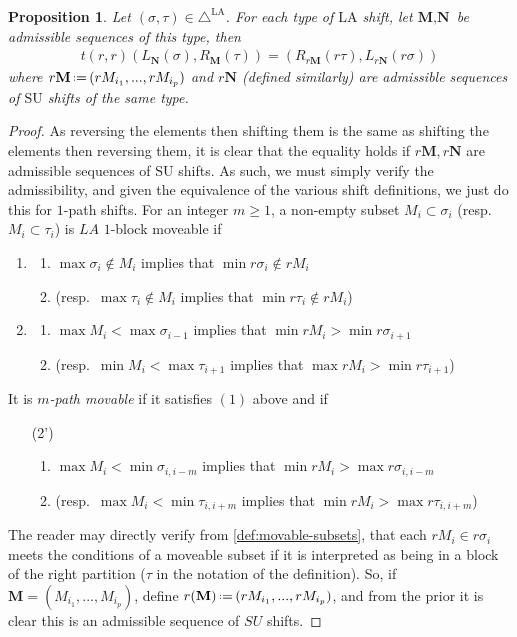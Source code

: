 \documentclass{amsart}
\newtheorem{proposition}[theorem]{Proposition}
\theoremstyle{definition}
\newcommand{\eqdef}{\mbox{\,\raisebox{0.2ex}{\scriptsize\ensuremath{\mathrm:}}\ensuremath{=}\,}} %
\newcommand{\SU}{\mathrm{SU}}
\newcommand{\LA}{\mathrm{LA}}
\newcommand{\LAD}{\triangle^{\mathrm{LA}}}
\begin{document}
\begin{proposition} \label{prop:trr is an isomorphism of shifts}
Let $(\sigma,\tau) \in \LAD$.
For each type of $\LA$ shift, let $\textbf{M},\textbf{N}$ be admissible sequences of this type, then 
\begin{align*}
    t(r,r)(L_\mathbf{N}(\sigma), R_\mathbf{M}(\tau)) = (R_{r\mathbf{M}}(r\tau), L_{r\mathbf{N}}(r\sigma))
\end{align*}
where $r\mathbf{M} \eqdef (rM_{i_1},...,rM_{i_p})$ and $r\mathbf{N}$ (defined similarly) are admissible sequences of $\SU$ shifts of the same type.
\end{proposition}
\begin{proof}
As reversing the elements then shifting them is the same as shifting the elements then reversing them,
it is clear that the equality holds if $r\mathbf{M},r\mathbf{N}$ are admissible sequences of $\SU$ shifts.
As such, we must simply verify the admissibility, and given the equivalence of the various shift definitions, we just do this for $1$-path shifts.
For an integer $m\geq 1$, a non-empty subset $M_i \subset \sigma_i$ (resp.~$M_{i}\subset \tau_{i}$) is $LA$ $1$-block moveable if
\begin{enumerate}
    \item 
    \begin{enumerate}
        \item $\max \sigma_i \notin M_i$ implies that $ \min r\sigma_i \not \in r M_i$
        \item (resp.~$\max \tau_{i} \notin M_i$ implies that  $ \min r\tau_{i} \not \in r M_i$)
    \end{enumerate}
    \item 
    \begin{enumerate}
        \item $\max M_i < \max \sigma_{i-1}$  implies that $\min r M_i > \min r \sigma_{i+1}$
        \item (resp.~$\min M_{i} < \max \tau_{i+1}$ implies that $\max rM_{i} > \min r\tau_{i+1}$)
    \end{enumerate}
\end{enumerate}
It is \emph{$m$-path movable} if it satisfies $(1)$ above and if
\begin{enumerate}
    \item[(2')] 
    \begin{enumerate}
        \item $\max M_i < \min \sigma_{i,i-m}$ implies that $\min r M_i > \max r \sigma_{i,i-m}$
        \item (resp.~$\max M_{i} < \min \tau_{i,i+m}$ implies that $\min r M_{i} > \max r\tau_{i,i+m}$)
    \end{enumerate}
\end{enumerate}
The reader may directly verify from \cref{def:movable-subsets}, that each $rM_i \in r\sigma_i$ meets the conditions of a moveable subset 
if it is interpreted as being in a block of the right partition ($\tau$ in the notation of the definition).
So, if $\mathbf{M} = (M_{i_1},...,M_{i_p})$, define $r(\mathbf{M}) \eqdef (rM_{i_1},...,rM_{i_p})$, and from the prior it is clear this is an admissible sequence of $SU$ shifts.

\end{proof}
\end{document}
